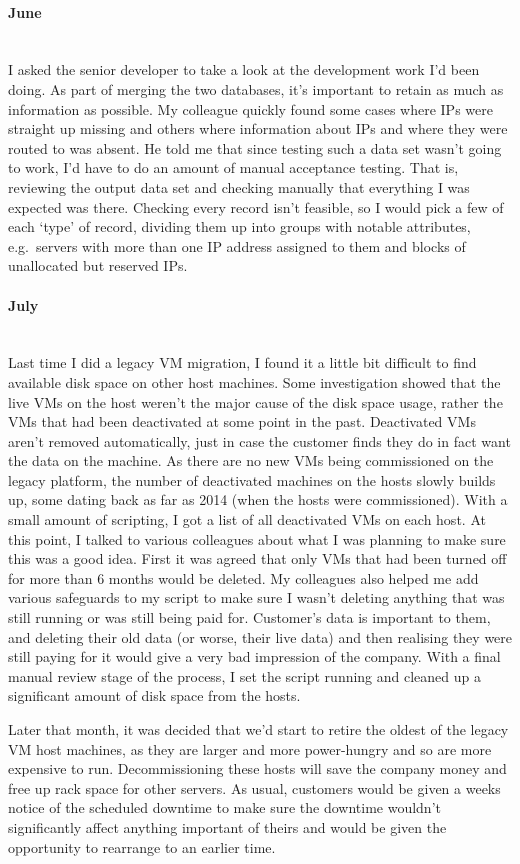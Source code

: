\documentclass[12pt,a4paper]{article}
\newcommand{\paragraphnl}[1]{\paragraph{#1}\mbox{}\\}
\begin{document}
\paragraphnl{June}
	I asked the senior developer to take a look at the development work I'd been
	doing. As part of merging the two databases, it's important to retain as
	much as information as possible. My colleague quickly found some cases where
	IPs were straight up missing and others where information about IPs and
	where they were routed to was absent. He told me that since testing such a
	data set wasn't going to work, I'd have to do an amount of manual acceptance
	testing. That is, reviewing the output data set and checking manually that
	everything I was expected was there. Checking every record isn't feasible,
	so I would pick a few of each `type' of record, dividing them up into groups
	with notable attributes, e.g.~servers with more than one IP address assigned
	to them and blocks of unallocated but reserved IPs.

\paragraphnl{July}
	Last time I did a legacy VM migration, I found it a little bit difficult to
	find available disk space on other host machines. Some investigation showed
	that the live VMs on the host weren't the major cause of the disk space
	usage, rather the VMs that had been deactivated at some point in the past.
	Deactivated VMs aren't removed automatically, just in case the customer
	finds they do in fact want the data on the machine. As there are no new
	VMs being commissioned on the legacy platform, the number of deactivated
	machines on the hosts slowly builds up, some dating back as far as 2014
	(when the hosts were commissioned). With a small amount of scripting, I got
	a list of all deactivated VMs on each host. At this point, I talked to
	various colleagues about what I was planning to make sure this was a good
	idea. First it was agreed that only VMs that had been turned off for more
	than 6 months would be deleted. My colleagues also helped me add various
	safeguards to my script to make sure I wasn't deleting anything that was
	still running or was still being paid for. Customer's data is important to
	them, and deleting their old data (or worse, their live data) and then
	realising they were still paying for it would give a very bad impression of
	the company. With a final manual review stage of the process, I set the
	script running and cleaned up a significant amount of disk space from the
	hosts.

	Later that month, it was decided that we'd start to retire the oldest of the
	legacy VM host machines, as they are larger and more power-hungry and so are
	more expensive to run. Decommissioning these hosts will save the company
	money and free up rack space for other servers. As usual, customers would be
	given a weeks notice of the scheduled downtime to make sure the downtime
	wouldn't significantly affect anything important of theirs and would be
	given the opportunity to rearrange to an earlier time.
\end{document}
